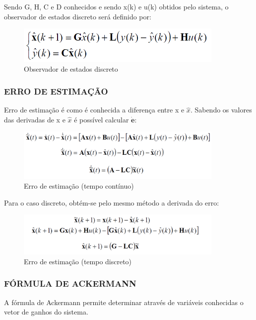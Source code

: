 \documentclass[a4paper,12pt]{article}
\begin{document}
Sendo G, H, C e D conhecidos e sendo x(k) e u(k) obtidos pelo sistema, o observador de estados discreto será definido por:

\begin{figure}[h]
\centering
\includegraphics[width=10cm]{fotosLab5/observador_discreto.png}
\caption{Observador de estados discreto}
\label{ob_discreto}
\end{figure}

\subsubsection{ERRO DE ESTIMAÇÃO}
Erro de estimação é como é conhecida a diferença entre x e $\hat{x}$. Sabendo os valores das derivadas de x e $\hat{x}$ é possível calcular $\dot{\mathbf{e}}$:


\begin{figure}[!h]
\centering
\includegraphics[width=10cm]{fotosLab5/erro_continuo.png}
\caption{Erro de estimação (tempo contínuo)}
\label{erro_continuo}
\end{figure}

Para o caso discreto, obtém-se pelo mesmo método a derivada do erro:

\begin{figure}[!h]
\centering
\includegraphics[width=10cm]{fotosLab5/erro_discreto.png}
\caption{Erro de estimação (tempo discreto)}
\label{erro_discreto}
\end{figure}

\subsubsection{FÓRMULA DE ACKERMANN}

\hspace{4ex}A fórmula de Ackermann permite determinar através de variáveis conhecidas o vetor de ganhos do sistema.
\end{document}
